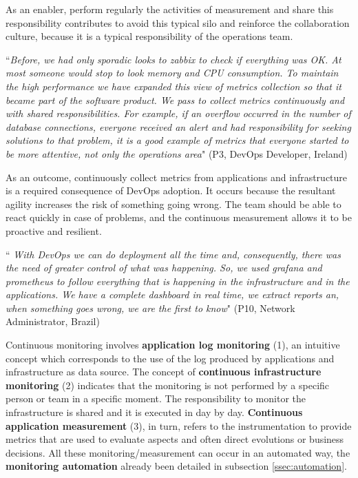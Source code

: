 As an enabler, perform regularly the activities of measurement and share this
responsibility contributes to avoid this typical silo and reinforce the
collaboration culture, because it is a typical responsibility of the operations
team.

\begin{mq}
``\emph{Before, we had only sporadic looks to zabbix to check if everything was OK.
At most someone would stop to look memory and CPU consumption. To maintain the
high performance we have expanded this view of metrics collection so that it
became part of the software product. We pass to collect metrics continuously
and with shared responsibilities. For example, if an overflow occurred in the
number of database connections, everyone received an alert and had
responsibility for seeking solutions to that problem, it is a good example of
metrics that everyone started to be more attentive, not only the operations
area}" (P3, DevOps Developer, Ireland)
\end{mq}

As an outcome, continuously collect metrics from applications and
infrastructure is a required consequence of DevOps adoption. It occurs because
the resultant agility increases the risk of something going wrong. The team
should be able to react quickly in case of problems, and the continuous
measurement allows it to be proactive and resilient.

\begin{mq}
``\emph{
With DevOps we can do deployment all the time and, consequently, there was
the need of greater control of what was happening. So, we used grafana and
prometheus to follow everything that is happening in the infrastructure and in
the applications. We have a complete dashboard in real time, we extract reports
an, when something goes wrong, we are the first to know}" (P10, Network
Administrator, Brazil)
\end{mq}

Continuous monitoring involves \textbf{application log monitoring} (1), an
intuitive concept which corresponds to the use of the log produced by
applications and infrastructure as data source. The concept of
\textbf{continuous infrastructure monitoring} (2) indicates that the monitoring
is not performed by a specific person or team in a specific moment. The
responsibility to monitor the infrastructure is shared and it is executed in
day by day. \textbf{Continuous application measurement} (3), in turn, refers to
the instrumentation to provide metrics that are used to evaluate aspects and
often direct evolutions or business decisions. All these monitoring/measurement
can occur in an automated way, the \textbf{monitoring automation} already been
detailed in subsection \ref{ssec:automation}.

